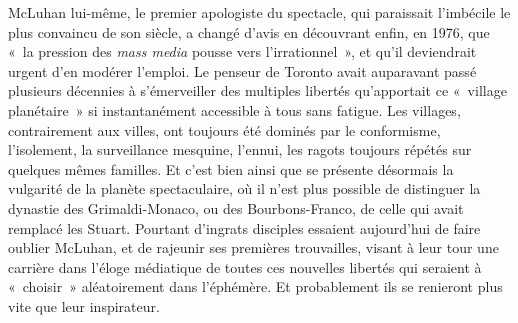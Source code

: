 \documentclass[french,twoside]{book} %
\def\mednobreak{\ifdim\lastskip<\medskipamount
  \removelastskip\nopagebreak\medskip\fi}
\newcommand{\labelblock}[1]{\medbreak{\noindent\color{rubric}\bfseries #1}\par\mednobreak}
\begin{document}
McLuhan lui-même, le premier apologiste du spectacle, qui paraissait l’imbécile le plus convaincu de son siècle, a changé d’avis en découvrant enfin, en 1976, que « la pression des \emph{mass media} pousse vers l’irrationnel », et qu’il deviendrait urgent d’en modérer l’emploi. Le penseur de Toronto avait auparavant passé plusieurs décennies à s’émerveiller des multiples libertés qu’apportait ce « village planétaire » si instantanément accessible à tous sans fatigue. Les villages, contrairement aux villes, ont toujours été dominés par le conformisme, l’isolement, la surveillance mesquine, l’ennui, les ragots toujours répétés sur quelques mêmes familles. Et c’est bien ainsi que se présente désormais la vulgarité de la planète spectaculaire, où il n’est plus possible de distinguer la dynastie des Grimaldi-Monaco, ou des Bourbons-Franco, de celle qui avait remplacé les Stuart. Pourtant d’ingrats disciples essaient aujourd’hui de faire oublier McLuhan, et de rajeunir ses premières trouvailles, visant à leur tour une carrière dans l’éloge médiatique de toutes ces nouvelles libertés qui seraient à « choisir » aléatoirement dans l’éphémère. Et probablement ils se renieront plus vite que leur inspirateur.\par

\labelblock{XIII}
\end{document}
